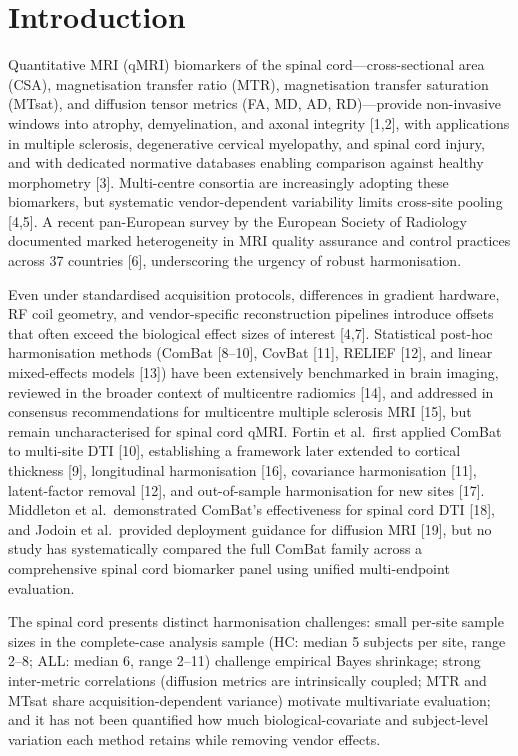 \documentclass[12pt,a4paper]{article}
\begin{document}
\section{Introduction}

Quantitative MRI (qMRI) biomarkers of the spinal cord---cross-sectional area (CSA), magnetisation transfer ratio (MTR), magnetisation transfer saturation (MTsat), and diffusion tensor metrics (FA, MD, AD, RD)---provide non-invasive windows into atrophy, demyelination, and axonal integrity [1,2], with applications in multiple sclerosis, degenerative cervical myelopathy, and spinal cord injury, and with dedicated normative databases enabling comparison against healthy morphometry [3]. Multi-centre consortia are increasingly adopting these biomarkers, but systematic vendor-dependent variability limits cross-site pooling [4,5]. A recent pan-European survey by the European Society of Radiology documented marked heterogeneity in MRI quality assurance and control practices across 37 countries [6], underscoring the urgency of robust harmonisation.

Even under standardised acquisition protocols, differences in gradient hardware, RF coil geometry, and vendor-specific reconstruction pipelines introduce offsets that often exceed the biological effect sizes of interest [4,7]. Statistical post-hoc harmonisation methods (ComBat [8--10], CovBat [11], RELIEF [12], and linear mixed-effects models [13]) have been extensively benchmarked in brain imaging, reviewed in the broader context of multicentre radiomics [14], and addressed in consensus recommendations for multicentre multiple sclerosis MRI [15], but remain uncharacterised for spinal cord qMRI. Fortin et al.\ first applied ComBat to multi-site DTI [10], establishing a framework later extended to cortical thickness [9], longitudinal harmonisation [16], covariance harmonisation [11], latent-factor removal [12], and out-of-sample harmonisation for new sites [17]. Middleton et al.\ demonstrated ComBat's effectiveness for spinal cord DTI [18], and Jodoin et al.\ provided deployment guidance for diffusion MRI [19], but no study has systematically compared the full ComBat family across a comprehensive spinal cord biomarker panel using unified multi-endpoint evaluation.

The spinal cord presents distinct harmonisation challenges: small per-site sample sizes in the complete-case analysis sample (HC: median 5 subjects per site, range 2--8; ALL: median 6, range 2--11) challenge empirical Bayes shrinkage; strong inter-metric correlations (diffusion metrics are intrinsically coupled; MTR and MTsat share acquisition-dependent variance) motivate multivariate evaluation; and it has not been quantified how much biological-covariate and subject-level variation each method retains while removing vendor effects.
\end{document}
